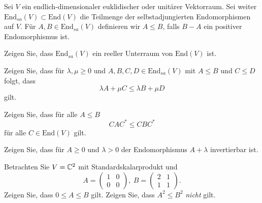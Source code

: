 \begin{Problem}
	Sei $V$ ein endlich-dimensionaler euklidischer oder unitärer Vektorraum. Sei weiter $\text{End}_{sa}(V)\subset \text{End}(V)$ die Teilmenge der selbstadjungierten Endomorphismen auf $V$. F\"{u}r $A,B\in \text{End}_{sa}(V)$ definieren wir $A\le B$, falls $B-A$ ein positiver Endomorphismus ist.
	\begin{parts}
	\item Zeigen Sie, dass $\text{End}_{sa}(V)$ ein reeller Unterraum von $\text{End}(V)$ ist.
	\item Zeigen Sie, dass f\"{u}r $\lambda,\mu\ge 0$ und $A,B,C,D\in \text{End}_{sa}(V)$ mit $A\le B$ und $C\le D$ folgt, dass
		\[
		\lambda A+\mu C\le \lambda B+\mu D
	\]
	gilt.
\item Zeigen Sie, dass f\"{u}r alle $A\le B$ 
	\[
	CAC^*\le CBC^*
\]
f\"{u}r alle $C\in \text{End}(V)$ gilt.
\item Zeigen Sie, dass f\"{u}r $A\ge 0$ und $\lambda>0$ der Endomorphismus $A+\lambda$ invertierbar ist.
\item Betrachten Sie $V=\mathbb{C}^2$ mit Standardskalarprodukt und
	\[
		A=\begin{pmatrix} 1 & 0 \\ 0 & 0 \end{pmatrix} ,~B=\begin{pmatrix} 2 & 1 \\ 1 & 1 \end{pmatrix} 
	.\]
	Zeigen Sie, dass $0\le A \le B$ gilt. Zeigen Sie, dass $A^2\le B^2$ \emph{nicht} gilt.
	\end{parts}
\end{Problem}
